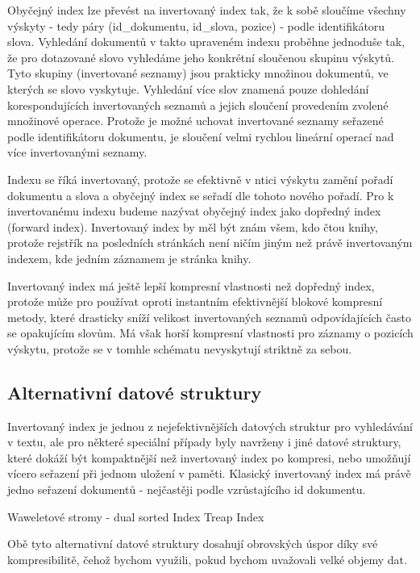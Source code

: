 \documentclass[11pt,letterpaper,oneside,openright]{book}
\begin{document}
Obyčejný index lze převést na invertovaný index tak, že k sobě sloučíme všechny
výskyty - tedy páry (id\_dokumentu, id\_slova, pozice) - podle identifikátoru
slova. Vyhledání dokumentů v takto upraveném indexu proběhne jednoduše tak, že
pro dotazované slovo vyhledáme jeho konkrétní sloučenou skupinu výskytů. Tyto
skupiny (invertované seznamy) jsou prakticky množinou dokumentů, ve kterých se
slovo vyskytuje. Vyhledání více slov znamená pouze dohledání korespondujících
invertovaných seznamů a jejich sloučení provedením zvolené množinové operace.
Protože je možné uchovat invertované seznamy seřazené podle identifikátoru
dokumentu, je sloučení velmi rychlou lineární operací nad více invertovanými
seznamy.

Indexu se říká invertovaný, protože se efektivně v ntici výskytu zamění pořadí
dokumentu a slova a obyčejný index se seřadí dle tohoto nového pořadí. Pro k
invertovanému indexu budeme nazývat obyčejný index jako dopředný index (forward
index). Invertovaný index by měl být znám všem, kdo čtou knihy, protože
rejstřík na posledních stránkách není ničím jiným než právě invertovaným
indexem, kde jedním záznamem je stránka knihy.

Invertovaný index má ještě lepší kompresní vlastnosti než dopředný index,
protože může pro používat oproti instantním efektivnější blokové kompresní
metody, které drasticky sníží velikost invertovaných seznamů odpovídajících
často se opakujícím slovům. Má však horší kompresní vlastnosti pro záznamy o
pozicích výskytu, protože se v tomhle schématu nevyskytují striktně za sebou.


\subsection{Alternativní datové struktury}
Invertovaný index je jednou z nejefektivnějších datových struktur pro vyhledávání v
textu, ale pro některé speciální případy byly navrženy i jiné datové struktury,
které dokáží být kompaktnější než invertovaný index po kompresi, nebo umožňují
vícero seřazení při jednom uložení v paměti. Klasický invertovaný index má
právě jedno seřazení dokumentů - nejčastěji podle vzrůstajícího id dokumentu.

Waweletové stromy - dual sorted Index Treap Index

Obě tyto alternativní datové struktury dosahují obrovských úspor díky své
kompresibilitě, čehož bychom využili, pokud bychom uvažovali velké objemy dat.
\end{document}
